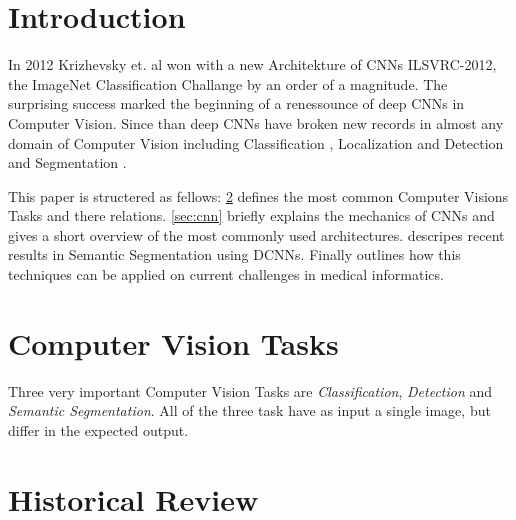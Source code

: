\section{Introduction}\label{sec:introduction}

In 2012 Krizhevsky et. al \cite{AlexNet} won with a new Architekture of CNNs ILSVRC-2012, the ImageNet Classification Challange by an order of a magnitude. The surprising success marked the beginning of a renessounce of deep CNNs in Computer Vision. Since than deep CNNs have broken new records in almost any domain of Computer Vision including Classification \cite{AlexNet,VGG16,googLeNeT}, Localization and Detection \cite{RNN,overfeat} and Segmentation \cite{fcn,CRF1,googleSeg}.


This paper is structered as fellows: \cref{sec:tasks} defines the most common Computer Visions Tasks and there relations. \cref{sec:cnn} briefly explains the mechanics of CNNs and gives a short overview of the most commonly used architectures.  descripes recent results in Semantic Segmentation using \Glspl{DCNN}. Finally  outlines how this techniques can be applied on current challenges in medical informatics.


\section{Computer Vision Tasks} \label{sec:tasks}

Three very important Computer Vision Tasks are \emph{Classification}, \emph{Detection} and \emph{Semantic Segmentation}. All of the three task have as input a single image, but differ in the expected output.


\section{Historical Review}\label{sec:review}

\iffalse

Krizhevsky et. al \cite{AlexNet} won the .

AlexNet was improved by several Authors in the succeeding years to archieve even better classification results in the ILSVRC-2013 and 2014. Most notable are GoogLeNet \cite{googLeNeT} and VGG16 \cite{VGG16}. Beeing designed independently, both Networks utilize filters with very small kernel size ($3\times 3$ and $1 \times 1$) and other parameter reduction techniques in order to severely increase the deepth of their network.


\cite{AlexNet} al introduced a novel \gls{CNN} architecture. 

\fi







